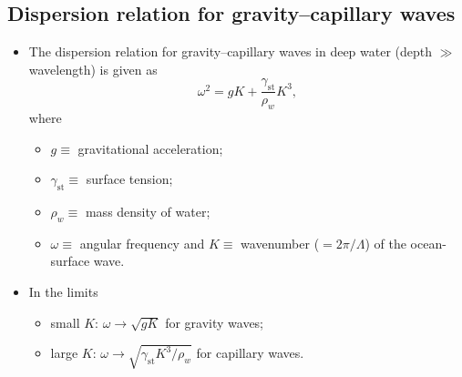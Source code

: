 \documentclass[11pt, oneside]{article}
\begin{document}
\subsection{Dispersion relation for gravity--capillary waves}

\begin{itemize}
	\item The dispersion relation for gravity--capillary waves in deep water (depth $\gg$ wavelength) is given as
	\begin{equation}
		\label{e:disp}
		\omega^2 = gK + \frac{\gamma_\mathrm{st}}{\rho_w}K^3,
	\end{equation}
	where
	\begin{itemize}
		\item $g \equiv$ gravitational acceleration;
		\item $\gamma_\mathrm{st} \equiv$ surface tension;
		\item $\rho_w \equiv$ mass density of water;
		\item $\omega \equiv$ angular frequency and $K \equiv$ wavenumber ($= 2\pi/\Lambda$) of the ocean-surface wave.
	\end{itemize}
	\item In the limits
	\begin{itemize}
		\item small $K$: $\omega \rightarrow \sqrt{gK}$ for gravity waves;
		\item large $K$: $\omega \rightarrow \sqrt{\gamma_\mathrm{st}K^3/\rho_w}$ for capillary waves.
	\end{itemize}

\end{itemize}
\end{document}
